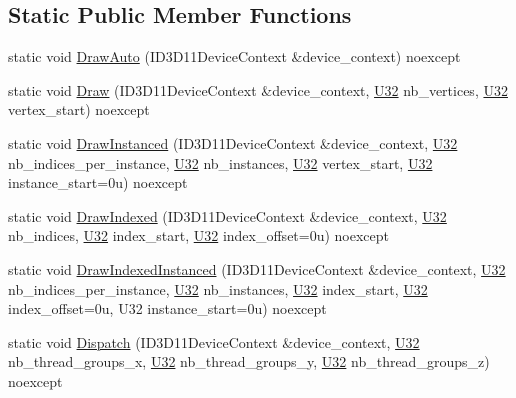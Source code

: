 \subsection*{Static Public Member Functions}
\begin{DoxyCompactItemize}
\item 
static void \hyperlink{structmage_1_1rendering_1_1_pipeline_a30cdc51051e3fcab0d3a9c36efad40e4}{Draw\+Auto} (I\+D3\+D11\+Device\+Context \&device\+\_\+context) noexcept
\item 
static void \hyperlink{structmage_1_1rendering_1_1_pipeline_acc764fee84589a85e0e2df129b34b137}{Draw} (I\+D3\+D11\+Device\+Context \&device\+\_\+context, \hyperlink{namespacemage_a41c104c036fba3756a74e19f793eeaa1}{U32} nb\+\_\+vertices, \hyperlink{namespacemage_a41c104c036fba3756a74e19f793eeaa1}{U32} vertex\+\_\+start) noexcept
\item 
static void \hyperlink{structmage_1_1rendering_1_1_pipeline_af0d8580b1c0a672c3fc9558dc19408a3}{Draw\+Instanced} (I\+D3\+D11\+Device\+Context \&device\+\_\+context, \hyperlink{namespacemage_a41c104c036fba3756a74e19f793eeaa1}{U32} nb\+\_\+indices\+\_\+per\+\_\+instance, \hyperlink{namespacemage_a41c104c036fba3756a74e19f793eeaa1}{U32} nb\+\_\+instances, \hyperlink{namespacemage_a41c104c036fba3756a74e19f793eeaa1}{U32} vertex\+\_\+start, \hyperlink{namespacemage_a41c104c036fba3756a74e19f793eeaa1}{U32} instance\+\_\+start=0u) noexcept
\item 
static void \hyperlink{structmage_1_1rendering_1_1_pipeline_a8be1904461ee6bcd5e4b5b72d5cb79a8}{Draw\+Indexed} (I\+D3\+D11\+Device\+Context \&device\+\_\+context, \hyperlink{namespacemage_a41c104c036fba3756a74e19f793eeaa1}{U32} nb\+\_\+indices, \hyperlink{namespacemage_a41c104c036fba3756a74e19f793eeaa1}{U32} index\+\_\+start, \hyperlink{namespacemage_a41c104c036fba3756a74e19f793eeaa1}{U32} index\+\_\+offset=0u) noexcept
\item 
static void \hyperlink{structmage_1_1rendering_1_1_pipeline_a23ab5aea07be3bca0d9d7900518104b7}{Draw\+Indexed\+Instanced} (I\+D3\+D11\+Device\+Context \&device\+\_\+context, \hyperlink{namespacemage_a41c104c036fba3756a74e19f793eeaa1}{U32} nb\+\_\+indices\+\_\+per\+\_\+instance, \hyperlink{namespacemage_a41c104c036fba3756a74e19f793eeaa1}{U32} nb\+\_\+instances, \hyperlink{namespacemage_a41c104c036fba3756a74e19f793eeaa1}{U32} index\+\_\+start, \hyperlink{namespacemage_a41c104c036fba3756a74e19f793eeaa1}{U32} index\+\_\+offset=0u, U32 instance\+\_\+start=0u) noexcept
\item 
static void \hyperlink{structmage_1_1rendering_1_1_pipeline_a96bbf2861a3d4c10ba87c6b6f5228595}{Dispatch} (I\+D3\+D11\+Device\+Context \&device\+\_\+context, \hyperlink{namespacemage_a41c104c036fba3756a74e19f793eeaa1}{U32} nb\+\_\+thread\+\_\+groups\+\_\+x, \hyperlink{namespacemage_a41c104c036fba3756a74e19f793eeaa1}{U32} nb\+\_\+thread\+\_\+groups\+\_\+y, \hyperlink{namespacemage_a41c104c036fba3756a74e19f793eeaa1}{U32} nb\+\_\+thread\+\_\+groups\+\_\+z) noexcept

\end{DoxyCompactItemize}
